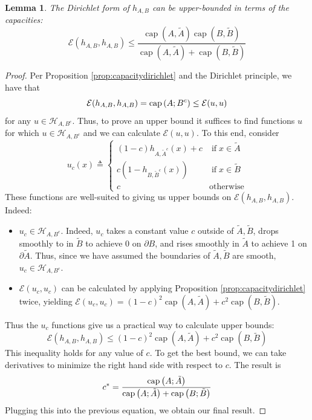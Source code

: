 \documentclass[english, aip, jcp, priprint, graphicx,floatfix]{revtex4-1}
\newcommand{\tmop}[1]{\ensuremath{\operatorname{#1}}}
\newtheorem{lemma}{Lemma}
\theoremstyle{plain}
\theoremstyle{definition}
\theoremstyle{plain}
\begin{document}
\begin{lemma}  The Dirichlet form of $h_{A,B}$ can be upper-bounded in terms of the capacities:
\[ \mathcal{E} (h_{A,B}, h_{A,B}) \leqslant \frac{\tmop{cap} (A, \tilde{A}) \tmop{cap} (B,
\tilde{B})}{\tmop{cap} (A, \tilde{A}) + \tmop{cap} (B, \tilde{B})} \]
\end{lemma}
\begin{proof}
Per Proposition \ref{prop:capacitydirichlet} and the Dirichlet principle, we have that 
%
\[
\mathcal{E} (h_{A,B}, h_{A,B}) = \mathrm{cap}\left(A;B^c\right) \leq \mathcal{E} (u,u)
\]
%
for any $u\in \mathcal{H}_{A, B^c}$.  Thus, to prove an upper bound it suffices to find functions $u$ for which $u\in \mathcal{H}_{A, B^c}$ and we can calculate $\mathcal{E}(u,u)$.  To this end, consider
%
\[
u_c (x) \triangleq \left\{ \begin{array}{ll}
(1 - c) h_{A, \widetilde{A}^c} (x) + c & \tmop{if} x \in \tilde{A}\\
c (1 - h_{B, \widetilde{B}^c} (x)) & \tmop{if} x \in \tilde{B}\\
c & \tmop{otherwise}
\end{array} \right. 
\]
%
These functions are well-suited to giving us upper bounds on $\mathcal{E} (h_{A,B}, h_{A,B})$.  Indeed:
\begin{itemize}
\item $u_c \in \mathcal{H}_{A, B^c}$.  Indeed, $u_c$ takes a constant value $c$ outside of $\tilde A,\tilde B$, drops smoothly to in $\tilde B$ to achieve 0 on $\partial B$, and rises smoothly in $\tilde A$ to achieve 1 on $\partial \tilde A$.  Thus, since we have assumed the boundaries of $\tilde A,\tilde B$ are smooth, $u_c \in \mathcal H_{A,B^c}$.  
\item $\mathcal{E}(u_c,u_c)$ can be calculated by applying Proposition \ref{prop:capacitydirichlet} twice, yielding $\mathcal{E}(u_c,u_c) = (1 - c)^2 \tmop{cap} (A, \tilde{A}) + c^2 \tmop{cap} (B, \tilde{B})$.
\end{itemize}
Thus the $u_c$ functions give us a practical way to calculate upper bounds: 
\[
\mathcal{E} (h_{A,B}, h_{A,B})\leq (1 - c)^2 \tmop{cap} (A, \tilde{A}) + c^2 \tmop{cap} (B, \tilde{B})
\]
This inequality holds for any value of $c$.  To get the best bound, we can take derivatives to minimize the right hand side with respect to $c$.  The result is 
\[
c^* = \frac{\mathrm{cap}\left(A;\tilde A\right)}{\mathrm{cap}\left(A;\tilde A\right)+\mathrm{cap}\left(B;\tilde B\right)}
\]
Plugging this into the previous equation, we obtain our final result.
\end{proof}
\end{document}
